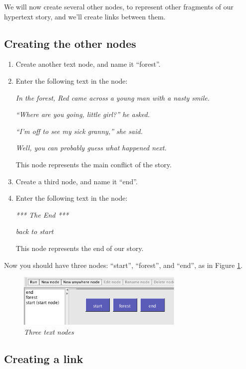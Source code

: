 \documentclass{article}
\begin{document}
We will now create several other nodes, to represent other fragments of our
hypertext story, and we'll create links between them.

\subsection{Creating the other nodes}

\begin{enumerate}
  \item Create another text node, and name it ``forest''.
  \item Enter the following text in the node:

\textit{In the forest, Red came across a young man with a nasty smile.}

\textit{``Where are you going, little girl?'' he asked.}

\textit{``I'm off to see my sick granny,'' she said.}

\textit{Well, you can probably guess what happened next.}

This node represents the main conflict of the story.

\item Create a third node, and name it ``end''.
\item Enter the following text in the node:

\textit{*** The End ***}

\textit{back to start}

This node represents the end of our story.
\end{enumerate}

Now you should have three nodes: ``start'', ``forest'', and ``end'', as in
Figure \ref{fig:three_nodes}.

 
\begin{figure}[ht]
  \centering
  \includegraphics[width=8cm]{images/hypedyn-tutorial-1-figure-6}
  \caption{\textit{Three text nodes}}
  \label{fig:three_nodes}
\end{figure} 

\subsection{Creating a link}
\end{document}
